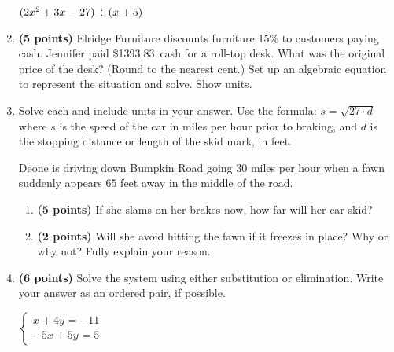 \documentclass[12pt]{amsart}
\begin{document}
\begin{enumerate}
$(2x^{2}+3x^{}-27) \div (x^{}+5)$

\vfill  \vfill \vfill
\newpage\def \discount{15}\def \paid{1393.83}\def \rainy{12.74}\def \orcost{1639.80}\def \purcost{1212.03}\def \orrainy{14.99}
\item {\bf (5 points)} 
 Elridge Furniture discounts furniture \discount\% to customers paying cash. Jennifer paid \$\paid\ cash for a roll-top desk. What was the original price of the desk? (Round to the nearest cent.) Set up an algebraic equation to represent the situation and solve. Show units.

\vfill 
\def \insvar{27}\def \d{65}\def \zerospeed{41.89}\def \slimit{30}\def \s{55}\def \skidd{112.037}\def \safed{33.333}\def \rsafed{33}

 
\item Solve each and include units in your answer. Use the formula: $s = \sqrt{\insvar \cdot d}$ where $s$ is the speed of the car in miles per hour prior to braking, and $d$ is the stopping distance or length of the skid mark, in feet. 

\vspace{3mm}

Deone is driving down Bumpkin Road going $\slimit$ miles per hour when a fawn suddenly appears $\d$ feet away in the middle of the road. \begin{enumerate}
\item {\bf (5 points)} If she slams on her brakes now, how far will her car skid? \vspace{4cm}
\item {\bf (2 points)} Will she avoid hitting the fawn if it freezes in place? Why or why not? Fully explain your reason. \vspace{3cm}
\end{enumerate}


\newpage\def \xis{-3}\def \yis{-2}\def \nomatcho{[5,2,2,3]}\def \a{5}\def \c{-2}\def \b{-2}\def \d{-3}\def \polyonesol{-11}\def \polytwosol{12}\def \xgoodone{5x^{}}\def \ygoodone{-2y^{}}\def \xgoodtwo{-2x^{}}\def \ygoodtwo{-3y^{}}\def \unitize{[1,0,0,0,1,0]}\def \mtem{3}\def \ntem{4}\def \ptem{-5}\def \qtem{5}\def \m{1}\def \n{4}\def \p{-5}\def \q{5}\def \polytonesol{-11}\def \polyttwosol{5}\def \xtgoodone{x^{}}\def \ytgoodone{+4y^{}}\def \xtgoodtwo{-5x^{}}\def \ytgoodtwo{+5y^{}}
\item {\bf (6 points)} 
 Solve the system using either substitution or elimination. Write your answer as an ordered pair, if possible. 

$ \begin{cases} \xtgoodone \ytgoodone = \polytonesol \\
\xtgoodtwo \ytgoodtwo = \polyttwosol
\end{cases}$


\end{enumerate}
\end{document}
